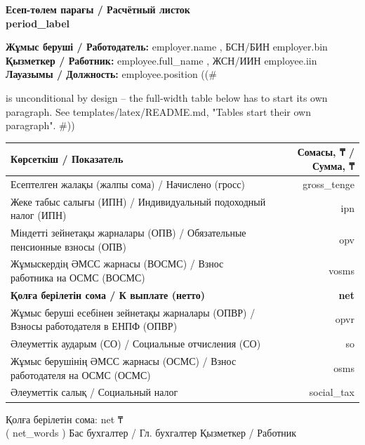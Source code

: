 \documentclass[a4paper,10pt]{article}
\newcommand{\field}[1]{\textbf{#1}}
\begin{document}
\begin{center}\Large\bfseries Есеп-төлем парағы / Расчётный листок\\
\normalsize {{ period_label }}\end{center}
\vspace{4mm}
\noindent\field{Жұмыс беруші / Работодатель:} {{ employer.name }}, БСН/БИН {{ employer.bin }}\\
\noindent\field{Қызметкер / Работник:} {{ employee.full_name }}, ЖСН/ИИН {{ employee.iin }}\\
\noindent\field{Лауазымы / Должность:} {{ employee.position }}
((# \par is unconditional by design -- the full-width table below has to start its
    own paragraph. See templates/latex/README.md, "Tables start their own paragraph". #))\par\vspace{4mm}
\noindent\begin{tabularx}{\textwidth}{@{}X r@{}}
\toprule
Көрсеткіш / Показатель & Сомасы, ₸ / Сумма, ₸ \\
\midrule
Есептелген жалақы (жалпы сома) / Начислено (гросс) & {{ gross_tenge }} \\
\midrule
Жеке табыс салығы (ИПН) / Индивидуальный подоходный налог (ИПН) & {{ ipn }} \\
Міндетті зейнетақы жарналары (ОПВ) / Обязательные пенсионные взносы (ОПВ) & {{ opv }} \\
Жұмыскердің ӘМСС жарнасы (ВОСМС) / Взнос работника на ОСМС (ВОСМС) & {{ vosms }} \\
\midrule
\bfseries Қолға берілетін сома / К выплате (нетто) & \bfseries {{ net }} \\
\midrule
Жұмыс беруші есебінен зейнетақы жарналары (ОПВР) / Взносы работодателя в ЕНПФ (ОПВР) & {{ opvr }} \\
Әлеуметтік аударым (СО) / Социальные отчисления (СО) & {{ so }} \\
Жұмыс берушінің ӘМСС жарнасы (ОСМС) / Взнос работодателя на ОСМС (ОСМС) & {{ osms }} \\
Әлеуметтік салық / Социальный налог & {{ social_tax }} \\
\bottomrule
\end{tabularx}
\vspace{3mm}
\noindent Қолға берілетін сома: {{ net }} ₸\\
({{ net_words }})
\vspace{12mm}
\noindent Бас бухгалтер / Гл. бухгалтер \hrulefill\qquad Қызметкер / Работник \hrulefill
\end{document}
